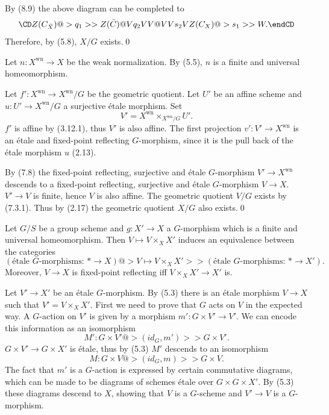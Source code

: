 By (8.9) the above diagram can be completed to
$$
\CD
Z(C_{\bar X})@>q_1>>  Z(\bar C)\\
@Vq_2VV @VVs_2V\\
Z(C_X) @>s_1>> W.
\endCD
$$
Therefore, by (5.8),     $X/G$ exists.\qed\enddemo

Let $n:X^{\text{wn}}\to X$ be the weak normalization. By (5.5), $n$ is a
finite and  universal homeomorphism.

Let $f':X^{\text{wn}}\to X^{\text{wn}}/G$ be the geometric quotient. Let $U'$
be an affine scheme and $u:U'\to X^{\text{wn}}/G$ a surjective \'etale
morphism. Set
$$
V'=X^{\text{wn}}\times_{X^{\text{wn}}/G}U'.
$$
$f'$ is affine by (3.12.1), thus $V'$ is also affine. The first projection
$v':V'\to X^{\text{wn}}$ is an \'etale and fixed-point
reflecting $G$-morphism, since it is the pull back of the
\'etale morphism
$u$ (2.13).

By (7.8) the  fixed-point
reflecting, surjective and \'etale  $G$-morphism  $V'\to X^{\text{wn}}$
descends to a fixed-point reflecting, surjective and \'etale  $G$-morphism
$V\to X$.  $V'\to V$ is finite, hence $V$ is also affine.
The geometric quotient $V/G$ exists by (7.3.1). Thus by (2.17)
the geometric quotient $X/G$ also exists.\qed\enddemo





  Let $G/S$ be a group scheme and
 $g:X'\to X$  a $G$-morphism which is a finite and
universal homeomorphism. Then $V\mapsto V\times_XX'$ induces an
equivalence between the categories
$$
(\text{\'etale $G$-morphisms: $\ast\to X$})
@>{V\mapsto V\times_XX'}>>
(\text{\'etale $G$-morphisms: $\ast\to X'$}).
$$
Moreover, $V\to X$ is fixed-point
reflecting iff $V\times_XX'\to X'$ is.
\endproclaim

\demop Let $V'\to X'$ be an \'etale $G$-morphism. By (5.3) there is an
\'etale morphism $V\to X$ such that $V'=V\times_XX'$. First we need to prove
that
$G$ acts on $V$ in the expected way. A $G$-action on $V'$ is given by a
morphism
$m':G\times V'\to V'$. We can encode this information as an isomorphism
$$
M': G\times V'@>{(id_G,m')}>> G\times V'.
$$
$G\times V'\to G\times X'$ is \'etale, thus by (5.3) $M'$ descends to an
isomorphism
$$
M: G\times V@>{(id_G,m)}>> G\times V.
$$
The fact that $m'$ is a $G$-action is expressed by certain commutative
diagrams, which can be made to be diagrams of schemes \'etale over
$G\times G\times X'$.  By (5.3) these diagrams descend to $X$, showing that $V$
is a $G$-scheme and $V'\to V$ is a $G$-morphism.

